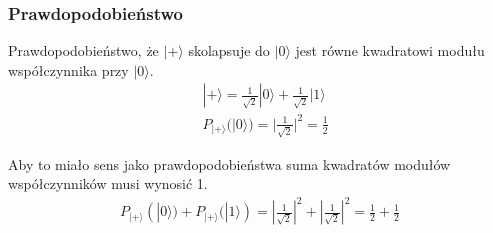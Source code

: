 \documentclass[10pt,t]{beamer}
\begin{document}
\begin{frame}
\begin{tikzpicture}









  \end{tikzpicture}

\end{frame}




\begin{frame}
  \frametitle{Prawdopodobieństwo}


  Prawdopodobieństwo, że $| + \rangle$ skolapsuje do $| 0 \rangle$ jest równe
  kwadratowi modułu współczynnika przy $| 0 \rangle$.
  \begin{align*}
    &| + \rangle =
      \frac{ 1 }{ \sqrt{ 2 } } | 0 \rangle + \frac{ 1 }{ \sqrt{ 2 } } | 1 \rangle \\
    &P_{ | + \rangle }( | 0 \rangle ) = | \frac{ 1 }{ \sqrt{ 2 } } |^{ 2 } =
      \frac{ 1 }{ 2 }
  \end{align*}

  Aby to miało sens jako prawdopodobieństwa suma kwadratów modułów
  współczynników musi wynosić 1.
  \begin{align*}
    P_{ | + \rangle }( | 0 \rangle ) + P_{ | + \rangle }( | 1 \rangle ) =
    | \frac{ 1 }{ \sqrt{ 2 } } |^{ 2 } + | \frac{ 1 }{ \sqrt{ 2 } } |^{ 2 }
    = \frac{ 1 }{ 2 } + \frac{ 1 }{ 2 }
  \end{align*}

\end{frame}
\end{document}

